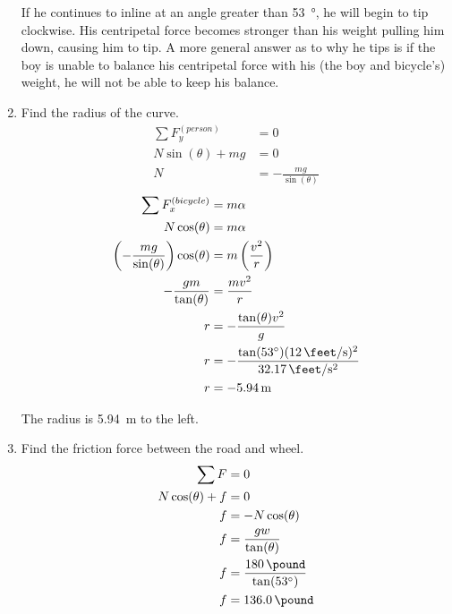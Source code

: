 \documentclass{article}
\begin{document}
\begin{enumerate}[label = \textbf{(\alph*)}]
\begin{center}
		\end{center}
		\begin{mdframed}
			If he continues to inline at an angle greater than \SI{53}{\degree}, he will begin to tip clockwise. His centripetal force becomes stronger than his weight pulling him down, causing him to tip. A more general answer as to why he tips is if the boy is unable to balance his centripetal force with his (the boy and bicycle's) weight, he will not be able to keep his balance.
		\end{mdframed}
	\item Find the radius of the curve.
		\begin{align*}
			\sum F_y^{(person)} & = 0 \\
			N\sin(\theta) + mg & = 0 \\
			N & = -\frac{ mg }{ \sin(\theta) }
		\end{align*}
		\begin{align*}
			\sum F_x^{(bicycle)} & = m\alpha \\
			N\cos(\theta) & = m\alpha \\
			\left( -\frac{ mg }{ \sin(\theta) } \right) \cos(\theta) & = m \left( \frac{ v^2 }{ r } \right) \\
			-\frac{ gm }{ \tan(\theta) } & = \frac{ mv^2 }{ r } \\
			r & = -\frac{ \tan(\theta)v^2 }{ g } \\
			r & = -\frac{ \tan(\SI{53}{\degree})(\SI{12}{\feet \per \second})^2 }{ \SI{32.17}{\feet \per \second \squared} } \\
			r & = \SI{-5.94}{\meter}
		\end{align*}
		\begin{mdframed}
			The radius is \SI{5.94}{\meter} to the left.
		\end{mdframed}
	\item Find the friction force between the road and wheel.
		\begin{align*}
			\sum F & = 0 \\
			N\cos(\theta) + f & = 0 \\
			f & = -N\cos(\theta) \\
			f & = \frac{ gw }{ \tan(\theta) } \\
			f & = \frac{ \SI{180}{\pound} }{ \tan(\SI{53}{\degree}) } \\
			f & = \SI{136.0}{\pound}
		\end{align*}
\end{enumerate}
\end{document}
